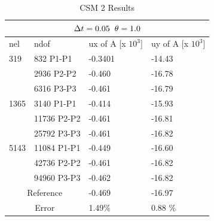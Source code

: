 \begin{table}[h!]
\centering
\caption{CSM 2 Results}
\label{CSM 2 Results}
\begin{tabular}{ |p{1cm}||p{2.7cm}|p{3.3cm}|p{3.3cm}|}
\hline
  \multicolumn{4}{|c|}{$\Delta t = 0.05 \hspace{2mm} \theta = 1.0$} \\
\hline
nel & ndof & ux of A [x $10^{3}$]  &uy of A [x $10^{3}$] \\
\hline

 319     & 832 P1-P1  & -0.3401 &  -14.43  \\ 
     & 2936 P2-P2 &  -0.460  &  -16.78  \\ 
      & 6316 P3-P3 & -0.461 &  -16.79  \\
        \hline
  1365    & 3140 P1-P1  &  -0.414 &  -15.93\\
     & 11736 P2-P2 &  -0.461 &  -16.81 \\
     & 25792 P3-P3 & -0.461  &  -16.82 \\
        \hline
   5143    & 11084 P1-P1 & -0.449 &  -16.60  \\
     & 42736 P2-P2 &-0.461 &  -16.82 \\
     & 94960 P3-P3 & -0.462 &  -16.82 \\
  \hline
  \multicolumn{2}{|c|}{Reference}  & -0.469      & -16.97  \\
   \hline
    \multicolumn{2}{|c|}{Error}  & 1.49\%   & 0.88 \%\\
   \hline
\end{tabular}
\end{table}

